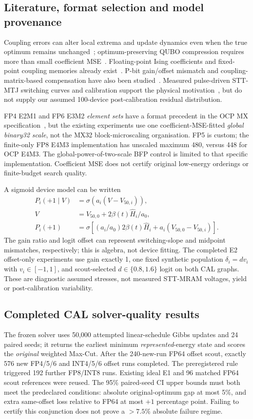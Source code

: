 \subsection{Literature, format selection and model provenance}
Coupling errors can alter local extrema and update dynamics even when the
true optimum remains unchanged~\cite{PbitHizzani2026};
optimum-preserving QUBO compression requires more than small coefficient
MSE~\cite{PbitMuecke2025}. Floating-point Ising coefficients and
fixed-point coupling memories already exist~\cite{PbitTao2023,S33,S32}.
P-bit gain/offset mismatch and coupling-matrix-based compensation have
also been studied~\cite{PbitZhang2025}.
Measured pulse-driven STT-MTJ switching curves and calibration support
the physical motivation~\cite{PbitYang2502026}, but do not supply our
assumed 100-device post-calibration residual distribution.

FP4 E2M1 and FP6 E3M2 \emph{element sets} have a format precedent in
the OCP MX specification~\cite{PbitOCPMX2023}, but the existing
experiments use one coefficient-MSE-fitted \emph{global binary32 scale},
not the MX32 block-microscaling organisation. FP5 is custom; the
finite-only FP8 E4M3 implementation has unscaled maximum 480, versus
448 for OCP E4M3. The global-power-of-two-scale BFP control is limited
to that specific implementation. Coefficient MSE does not certify
original low-energy orderings or finite-budget search quality.

A sigmoid device model can be written
\begin{align}
P_i(+1\mid V)&=\sigma(a_i(V-V_{50,i})),\\
V&=V_{50,0}+2\beta(t)\widehat H_i/a_0,\\
P_i(+1)&=\sigma\left[(a_i/a_0)2\beta(t)\widehat H_i+
  a_i(V_{50,0}-V_{50,i})\right].
\end{align}
The gain ratio and logit offset can represent switching-slope and
midpoint mismatches, respectively; this is algebra, not device fitting.
The completed E2 offset-only experiments use gain exactly 1, one fixed
synthetic population $\delta_i=d v_i$ with $v_i\in[-1,1]$, and
scout-selected $d\in\{0.8,1.6\}$ logit on both CAL graphs.
These are diagnostic assumed stresses, not measured STT-MRAM
voltages, yield or post-calibration variability.

\subsection{Completed CAL solver-quality results}
The frozen solver uses 50,000 attempted linear-schedule Gibbs updates
and 24 paired seeds; it returns the earliest minimum
\emph{represented}-energy state and scores the \emph{original}
weighted Max-Cut. After the 240-new-run FP64 offset scout, exactly
576 new FP4/5/6 and INT4/5/6 offset runs completed.
The preregistered rule triggered 192 further FP8/INT8 runs.
Existing ideal E1 and 96 matched FP64 scout references were reused.
The 95\% paired-seed CI upper bounds must both meet the predeclared
conditions: absolute original-optimum gap at most 5\%, and extra
same-offset loss relative to FP64 at most $+1$ percentage point.
Failing to certify this conjunction does not prove a $>7.5\%$
absolute failure regime.

